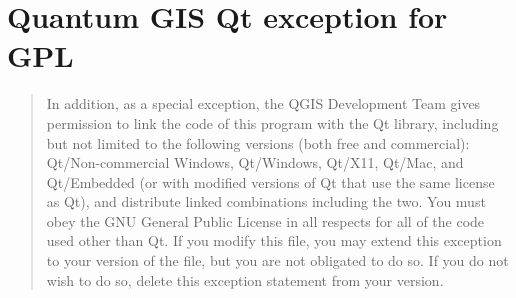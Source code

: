 \section{Quantum GIS Qt exception for GPL}\label{qgis_qt_exception_appendix}

\begin{quotation}
In addition, as a special exception, the QGIS Development Team gives
permission to link the code of this program with the Qt library,
including but not limited to the following versions (both free and
commercial): Qt/Non-commercial Windows, Qt/Windows, Qt/X11, Qt/Mac, and
Qt/Embedded (or with modified versions of Qt that use the same license
as Qt), and distribute linked combinations including the two. You must
obey the GNU General Public License in all respects for all of the code
used other than Qt. If you modify this file, you may extend this
exception to your version of the file, but you are not obligated to do
so. If you do not wish to do so, delete this exception statement from
your version.
\end{quotation}
